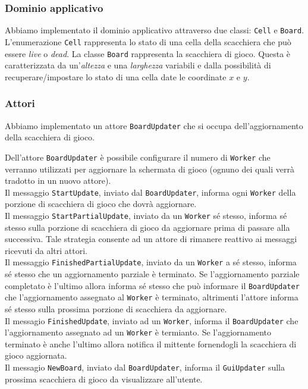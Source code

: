 \documentclass[a4paper]{article}
\begin{document}
\subsubsection{Dominio applicativo}\label{dominio-applicativo}

Abbiamo implementato il dominio applicativo attraverso due classi:
\texttt{Cell} e \texttt{Board}.\\
L'enumerazione \texttt{Cell} rappresenta lo stato di una cella della scacchiera che può essere \textit{live} o \textit{dead}.
La classe \texttt{Board} rappresenta la scacchiera di gioco. Questa è caratterizzata da un'\textit{altezza} e una \textit{larghezza} variabili e dalla possibilità di recuperare/impostare lo stato di una cella date le coordinate $x$ e $y$.

\subsubsection{Attori}\label{interattori}

Abbiamo implementato un attore \texttt{BoardUpdater} che si occupa dell'aggiornamento della scacchiera di gioco.

Dell'attore \texttt{BoardUpdater} è possibile configurare il numero di \texttt{Worker} che verranno utilizzati per aggiornare la schermata di gioco (ognuno dei quali verrà tradotto in un nuovo attore).\\
Il messaggio \texttt{StartUpdate}, inviato dal \texttt{BoardUpdater}, informa ogni \texttt{Worker} della porzione di scacchiera di gioco che dovrà aggiornare.\\
Il messaggio \texttt{StartPartialUpdate}, inviato da un \texttt{Worker} sé stesso, informa sé stesso sulla porzione di scacchiera di gioco da aggiornare prima di passare alla successiva. Tale strategia consente ad un attore di rimanere reattivo ai messaggi ricevuti da altri attori.\\
Il messaggio \texttt{FinishedPartialUpdate}, inviato da un \texttt{Worker} a sé stesso, informa sé stesso che un aggiornamento parziale è terminato. Se l'aggiornamento parziale completato è l'ultimo allora informa sé stesso che può informare il \texttt{BoardUpdater} che l'aggiornamento assegnato al \texttt{Worker} è terminato, altrimenti l'attore informa sé stesso sulla prossima porzione di scacchiera da aggiornare.\\
Il messagio \texttt{FinishedUpdate}, inviato ad un \texttt{Worker}, informa il \texttt{BoardUpdater} che l'aggiornamento assegnato ad un \texttt{Worker} è termianto. Se l'aggiornamento terminato è anche l'ultimo allora notifica il mittente fornendogli la scacchiera di gioco aggiornata.\\
Il messagio \texttt{NewBoard}, inviato dal \texttt{BoardUpdater}, informa il \texttt{GuiUpdater} sulla prossima scacchiera di gioco da visualizzare all'utente.
\end{document}

